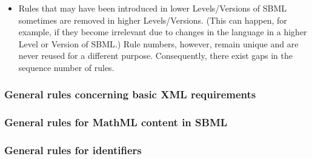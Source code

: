 \begin{itemize}
\item Rules that may have been introduced in lower Levels/Versions
  of SBML sometimes are removed in higher Levels/Versions.  (This
  can happen, for example, if they become irrelevant due to
  changes in the language in a higher Level or Version of SBML.)
  Rule numbers, however, remain unique and are never reused for a
  different purpose.  Consequently, there exist gaps in the
  sequence number of rules.

\end{itemize}


\subsubsection*{General rules concerning basic XML requirements} \begin{sbmlenum}


\end{sbmlenum} \subsubsection*{General rules for MathML content in SBML} \begin{sbmlenum}


\end{sbmlenum} \subsubsection*{General rules for identifiers}  \begin{sbmlenum}



\end{sbmlenum}
